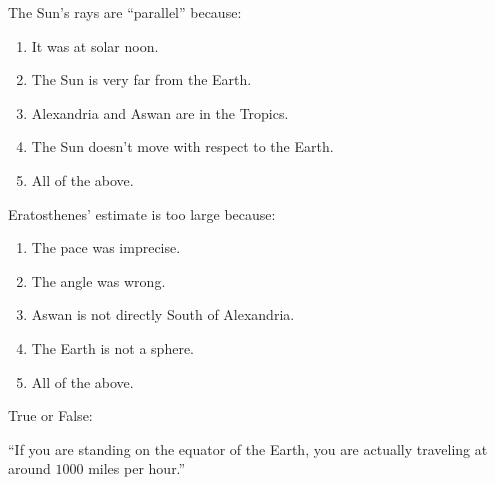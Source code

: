 \documentclass{ximera}
\author{Bart Snapp and Claire Merriman}
\begin{document}
\maketitle


\begin{exercise}
  The Sun's rays are ``parallel'' because:
  \begin{enumerate}
  \item It was at solar noon.
  \item The Sun is very far from the Earth.
  \item Alexandria and Aswan are in the Tropics.
  \item The Sun doesn't move with respect to the Earth.
  \item All of the above.
  \end{enumerate}
\end{exercise}

\begin{exercise}
  Eratosthenes' estimate is too large because:
  \begin{enumerate}
  \item The pace was imprecise.
  \item The angle was wrong.
  \item Aswan is not directly South of Alexandria. 
  \item The Earth is not a sphere.
  \item All of the above.
  \end{enumerate}
\end{exercise}




\begin{exercise}
  True or False:

  
  ``If you are standing on the equator of the Earth, you are actually traveling at around $1000$ miles per hour.''
\end{exercise}
\end{document}
